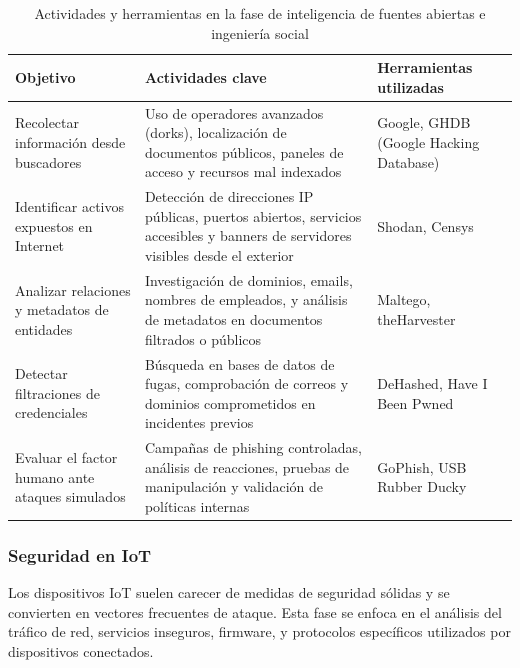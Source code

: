\documentclass[a4paper, 11pt]{article}
\begin{document}
\begin{table}[H]
\centering
\renewcommand{\arraystretch}{1.4}
\begin{tabular}{|p{4.3cm}|p{7.2cm}|p{3.6cm}|}
\hline
\textbf{Objetivo} & \textbf{Actividades clave} & \textbf{Herramientas utilizadas} \\
\hline
Recolectar información desde buscadores & Uso de operadores avanzados (dorks), localización de documentos públicos, paneles de acceso y recursos mal indexados & Google, GHDB (Google Hacking Database) \\
\hline
Identificar activos expuestos en Internet & Detección de direcciones IP públicas, puertos abiertos, servicios accesibles y banners de servidores visibles desde el exterior & Shodan, Censys \\
\hline
Analizar relaciones y metadatos de entidades & Investigación de dominios, emails, nombres de empleados, y análisis de metadatos en documentos filtrados o públicos & Maltego, theHarvester \\
\hline
Detectar filtraciones de credenciales & Búsqueda en bases de datos de fugas, comprobación de correos y dominios comprometidos en incidentes previos & DeHashed, Have I Been Pwned \\
\hline
Evaluar el factor humano ante ataques simulados & Campañas de phishing controladas, análisis de reacciones, pruebas de manipulación y validación de políticas internas & GoPhish, USB Rubber Ducky \\
\hline
\end{tabular}
\caption{Actividades y herramientas en la fase de inteligencia de fuentes abiertas e ingeniería social}
\label{tab:osint_ingenieria_social}
\end{table}








\subsubsection{Seguridad en IoT}

Los dispositivos IoT suelen carecer de medidas de seguridad sólidas y se convierten en vectores frecuentes de ataque. Esta fase se enfoca en el análisis del tráfico de red, servicios inseguros, firmware, y protocolos específicos utilizados por dispositivos conectados.
\end{document}
